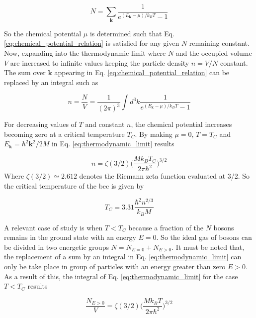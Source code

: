 \begin{equation}\label{eq:chemical_potential_relation}
N = \sum_{\mathbf{k}}\frac{1}{e^{(E_\mathbf{k} - \mu)/k_B T} - 1}
\end{equation}

So the chemical potential $\mu$ is determined such that Eq. \eqref{eq:chemical_potential_relation} is satisfied for any given $N$ remaining constant. Now, expanding into the thermodynamic limit where $N$ and the occupied volume $V$ are increased to infinite values keeping the particle density $n = V/N$ constant. The sum over $\mathbf{k}$ appearing in Eq. \eqref{eq:chemical_potential_relation} can be replaced by an integral such as

\begin{equation}\label{eq:thermodynamic_limit}
n = \frac{N}{V} =  \frac{1}{(2\pi)^3}\int d^3 k\frac{1}{e^{(E_\mathbf{k} - \mu)/k_B T} - 1}
\end{equation}

For decreasing values of $T$ and constant $n$, the chemical potential increases becoming zero at a critical temperature $T_C$. By making $\mu = 0$, $T = T_C$ and $E_\mathbf{k} = \hbar^2 \mathbf{k}^2 / 2M$ in Eq. \eqref{eq:thermodynamic_limit} results

\begin{equation}\label{eq:thermodynamic_limit_at_critical_conditions}
n =  \zeta(3/2) \bigg(\frac{M k_B T_C}{2 \pi \hbar^2}\bigg)^{3/2}
\end{equation}
Where $\zeta(3/2) \simeq 2.612$ denotes the Riemann zeta function evaluated at 3/2. So the critical temperature of the \ac{bec} is given by

\begin{equation}\label{eq:critical_temperature}
T_C = 3.31 \frac{\hbar^2 n^{2/3}}{k_B M}
\end{equation}

A relevant case of study is when $T < T_C$ because a fraction of the $N$ bosons remains in the ground state with an energy $E = 0$. So the ideal gas of bosons can be divided in two energetic groups $N = N_{E=0} + N_{E>0}$. It must be noted that, the replacement of a sum by an integral in Eq. \eqref{eq:thermodynamic_limit} can only be take place in group of particles with an energy greater than zero $E>0$. As a result of this, the integral of Eq. \eqref{eq:thermodynamic_limit} for the case $T < T_C$ results

\begin{equation}\label{eq:thermodynamic_limit_low_T}
\frac{N_{E>0}}{V} = \zeta(3/2) \bigg(\frac{M k_B T}{2 \pi \hbar^2}\bigg)^{3/2}
\end{equation}

